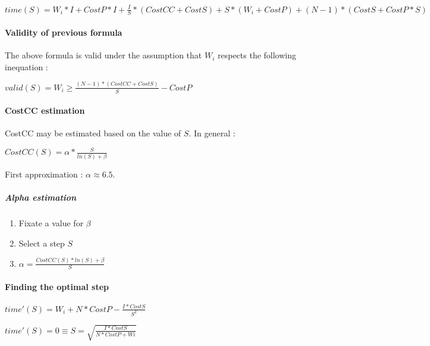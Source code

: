 \documentclass[a4paper,11pt]{article}
\begin{document}
    $ time(S) = W_i * I + CostP * I + \frac{I}{S} * (CostCC + CostS) + S * (W_i + CostP) + (N - 1) * (CostS + CostP * S) $
\medskip

\paragraph{Validity of previous formula}
The above formula is valid under the assumption that $ W_i $ respects the following inequation : 

    $ valid(S) = W_i \geq \frac{(N - 1) * (CostCC + CostS)}{S} - CostP $

\paragraph{CostCC estimation}

CostCC may be estimated based on the value of $ S $. In general :

$ CostCC(S) = \alpha * \frac{S}{ln(S) + \beta} $

First approximation : $ \alpha \approx 6.5 $.

\subparagraph{Alpha estimation}

\begin{enumerate}
    \item Fixate a value for $ \beta $
    \item Select a step $ S $
    \item $ \alpha = \frac{CostCC(S) * ln(S) + \beta}{S} $
\end{enumerate}

\paragraph{Finding the optimal step}

$ time'(S) = W_i + N * CostP - \frac{I * CostS}{S^2} $

$ time'(S) = 0 \equiv S = \sqrt{\frac{I * CostS}{N * CostP + Wi}} $
\end{document}
